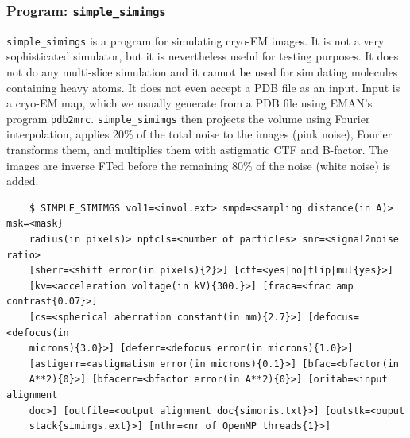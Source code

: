 \documentclass[a4paper,11pt]{article}
\newcommand{\prgname}[1]{\textcolor{NavyBlue}{\texttt{#1}}}
\begin{document}
\subsubsection{Program: \prgname{simple\_simimgs}}
\label{simimgs}
\prgname{simple\_simimgs} is a program for simulating cryo-EM images. It is not a very sophisticated simulator, but it is nevertheless useful for testing purposes. It does not do any multi-slice simulation and it cannot be used for simulating molecules containing heavy atoms. It does not even accept a PDB file as an input. Input is a cryo-EM map, which we usually generate from a PDB file using EMAN's program \texttt{pdb2mrc}. \prgname{simple\_simimgs} then projects the volume using Fourier interpolation, applies 20\% of the total noise to the images (pink noise), Fourier transforms them, and multiplies them with astigmatic CTF and B-factor. The images are inverse FTed before the remaining 80\% of the noise (white noise) is added.
\begin{verbatim}
    $ SIMPLE_SIMIMGS vol1=<invol.ext> smpd=<sampling distance(in A)> msk=<mask}
    radius(in pixels)> nptcls=<number of particles> snr=<signal2noise ratio>
    [sherr=<shift error(in pixels){2}>] [ctf=<yes|no|flip|mul{yes}>]
    [kv=<acceleration voltage(in kV){300.}>] [fraca=<frac amp contrast{0.07}>]
    [cs=<spherical aberration constant(in mm){2.7}>] [defocus=<defocus(in
    microns){3.0}>] [deferr=<defocus error(in microns){1.0}>]
    [astigerr=<astigmatism error(in microns){0.1}>] [bfac=<bfactor(in
    A**2){0}>] [bfacerr=<bfactor error(in A**2){0}>] [oritab=<input alignment
    doc>] [outfile=<output alignment doc{simoris.txt}>] [outstk=<ouput
    stack{simimgs.ext}>] [nthr=<nr of OpenMP threads{1}>]
\end{verbatim}
\end{document}
